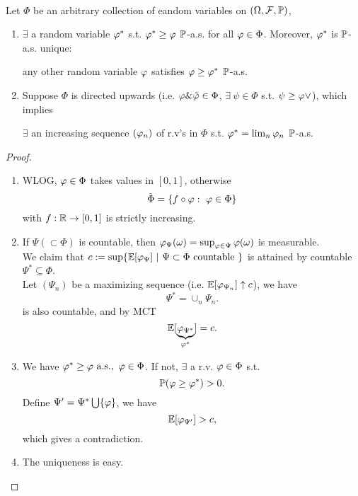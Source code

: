 \begin{theorem}\ \\
Let $\Phi$ be an arbitrary collection of eandom variables on $(\Omega, \Fs, \P)$,
\begin{enumerate}[label = (\alph*)]
    \item $\exists$ a random variable $\vphi^*$ s.t. $\vphi^* \geq \vphi$ $\P$-a.s. for all $\vphi \in \Phi$. Moreover, $\vphi^*$ is $\P$-a.s. unique:
    \begin{center}
         any other random variable $\vphi$ satisfies $\vphi \geq \vphi^*$ $\P$-a.s.
    \end{center}
    \item Suppose $\Phi$ is directed upwards (i.e. $\vphi \& \Tilde{\vphi} \in \Phi$, $\exists\ \psi \in \Phi$ s.t. $\psi \geq \vphi \vee \title{\vphi}$), which implies
    \begin{center}
        $\exists$ an increasing sequence $(\vphi_n)$ of r.v's in $\Phi$ s.t. $\vphi^* = \lim_{n} \vphi_n$ $\P$-a.s.
    \end{center}
\end{enumerate}
\end{theorem}
\begin{proof}\ 
\begin{enumerate}[label = (\arabic*)]
    \item WLOG, $\vphi \in \Phi$ takes values in $[0,1]$, otherwise 
\begin{equation*}
    \Tilde{\Phi} = \{f \circ \vphi:\ \vphi \in \Phi\}
\end{equation*}
    with $f : \R \to [0,1]$ is strictly increasing.
    \item If $\Psi (\subset \Phi)$ is countable, then $\vphi_{\Psi} (\omega) = \sup_{\vphi \in \Psi} \vphi(\omega)$ is measurable.\\
We claim that $c:= \sup \{\E[\vphi_{\Psi}]\ |\ \Psi \subset \Phi \text{ countable } \}$ is attained by countable $\Psi^* \subseteq \Phi$.\\
Let $(\Psi_n)$ be a maximizing sequence (i.e. $\E[\vphi_{\Psi_n}] \uparrow c$), we have
\begin{equation*}
    \Psi^* = \cup_n \Psi_n.
\end{equation*}
is also countable, and by MCT
\begin{equation*}
    \E[\underbrace{\vphi_{\Psi^*}}_{\vphi^*}] = c.
\end{equation*}
    \item We have $\vphi^* \geq \vphi \text{ a.s.},\ \vphi \in \Phi$. If not, $\exists$ a r.v. $\vphi \in \Phi$ s.t.
    \begin{equation*}
        \P(\vphi \geq \vphi^*) > 0.
    \end{equation*}
    Define $\Psi' = \Psi^* \cup \{\vphi\}$, we have
    \begin{equation*}
        \E[\vphi_{\Psi'}] > c,
    \end{equation*}
    which gives a contradiction.
    \item The uniqueness is easy.
\end{enumerate}
\end{proof}

